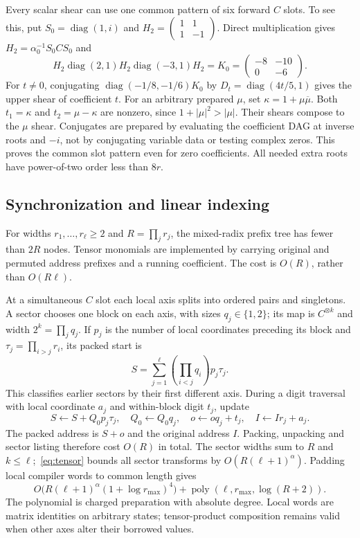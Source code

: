 \documentclass[11pt]{amsart}
\theoremstyle{remark}
\newcommand{\diag}{\operatorname{diag}}
\begin{document}
Every scalar shear can use one common pattern of six forward $C$
slots. To see this, put $S_0=\diag(1,i)$ and
$H_2=\left(\begin{smallmatrix}1&1\\1&-1\end{smallmatrix}\right)$.
Direct multiplication gives $H_2=\alpha_0^{-1}S_0CS_0$ and
\[
 H_2\diag(2,1)H_2\diag(-3,1)H_2
 =K_0=\begin{pmatrix}-8&-10\\0&-6\end{pmatrix}.
\]
For $t\ne0$, conjugating $\diag(-1/8,-1/6)K_0$ by
$D_t=\diag(4t/5,1)$ gives the upper shear of coefficient $t$.
For an arbitrary prepared $\mu$, set $\kappa=1+\mu\overline\mu$.
Both $t_1=\kappa$ and $t_2=\mu-\kappa$ are nonzero, since
$1+|\mu|^2>|\mu|$. Their shears compose to the $\mu$ shear.
Conjugates are prepared by evaluating the coefficient DAG at inverse
roots and $-i$, not by conjugating variable data or testing complex
zeros. This proves the common slot pattern even for zero coefficients.
All needed extra roots have power-of-two order less than $8r$.

\subsection{Synchronization and linear indexing}
For widths $r_1,\ldots,r_\ell\ge2$ and $R=\prod_jr_j$, the mixed-radix
prefix tree has fewer than $2R$ nodes. Tensor monomials are implemented
by carrying original and permuted address prefixes and a running
coefficient. The cost is $O(R)$, rather than $O(R\ell)$.

At a simultaneous $C$ slot each local axis splits into ordered pairs
and singletons. A sector chooses one block on each axis, with sizes
$q_j\in\{1,2\}$; its map is $C^{\otimes k}$ and width $2^k=\prod_jq_j$.
If $p_j$ is the number of local coordinates preceding its block and
$\tau_j=\prod_{i>j}r_i$, its packed start is
\[
 S=\sum_{j=1}^{\ell}\left(\prod_{i<j}q_i\right)p_j\tau_j.
\]
This classifies earlier sectors by their first different axis.
During a digit traversal with local coordinate $a_j$ and within-block
digit $t_j$, update
\[
 S\leftarrow S+Q_0p_j\tau_j,\quad Q_0\leftarrow Q_0q_j,\quad
 o\leftarrow oq_j+t_j,\quad I\leftarrow Ir_j+a_j.
\]
The packed address is $S+o$ and the original address $I$. Packing,
unpacking and sector listing therefore cost $O(R)$ in total. The
sector widths sum to $R$ and $k\le\ell$;~\eqref{eq:tensor} bounds
all sector transforms by $O(R(\ell+1)^\alpha)$. Padding local compiler
words to common length gives
\begin{equation}\label{eq:sync}
 O\bigl(R(\ell+1)^\alpha(1+\log r_{\max})^4\bigr)
       +\operatorname{poly}(\ell,r_{\max},\log(R+2)).
\end{equation}
The polynomial is charged preparation with absolute degree. Local
words are matrix identities on arbitrary states; tensor-product
composition remains valid when other axes alter their borrowed values.
\end{document}
